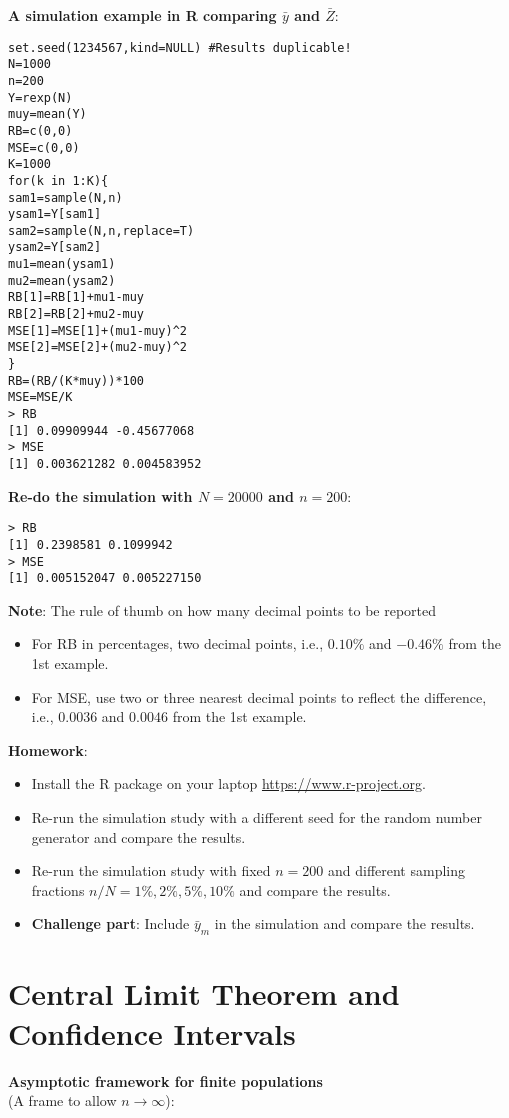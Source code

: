 \textbf{A simulation example in R comparing $ \bar{y} $ and $ \bar{Z} $}:

\begin{verbatim}
set.seed(1234567,kind=NULL) #Results duplicable!
N=1000
n=200
Y=rexp(N)
muy=mean(Y)
RB=c(0,0)
MSE=c(0,0)
K=1000
for(k in 1:K){
sam1=sample(N,n)
ysam1=Y[sam1]
sam2=sample(N,n,replace=T)
ysam2=Y[sam2]
mu1=mean(ysam1)
mu2=mean(ysam2)
RB[1]=RB[1]+mu1-muy
RB[2]=RB[2]+mu2-muy
MSE[1]=MSE[1]+(mu1-muy)^2
MSE[2]=MSE[2]+(mu2-muy)^2
}
RB=(RB/(K*muy))*100
MSE=MSE/K
> RB
[1] 0.09909944 -0.45677068
> MSE
[1] 0.003621282 0.004583952
    \end{verbatim}
\textbf{Re-do the simulation with $N = 20000$ and $n = 200$}:
\begin{verbatim}
> RB
[1] 0.2398581 0.1099942
> MSE
[1] 0.005152047 0.005227150
\end{verbatim}

\textbf{Note}: The rule of thumb on how many decimal points to be reported
\begin{itemize}
      \item For RB in percentages, two decimal points, i.e., $0.10\%$ and
            $-0.46\%$ from the 1st example.
      \item For MSE, use two or three nearest decimal points to reflect the
            difference, i.e., $0.0036$ and $0.0046$ from the 1st example.
\end{itemize}
\textbf{Homework}:
\begin{itemize}
      \item Install the R package on your laptop \href{https://www.r-project.org}{https://www.r-project.org}.
      \item Re-run the simulation study with a different seed for the random
            number generator and compare the results.
      \item Re-run the simulation study with fixed $n = 200$ and different
            sampling fractions $n/N = 1\%, 2\%, 5\%, 10\%$ and compare the
            results.
      \item \textbf{Challenge part}: Include $ \bar{y}_m $ in the simulation and compare the
            results.
\end{itemize}

\section{Central Limit Theorem and Confidence Intervals}
\textbf{Asymptotic framework for finite populations}\\
(A frame to allow $ n\to\infty $):

